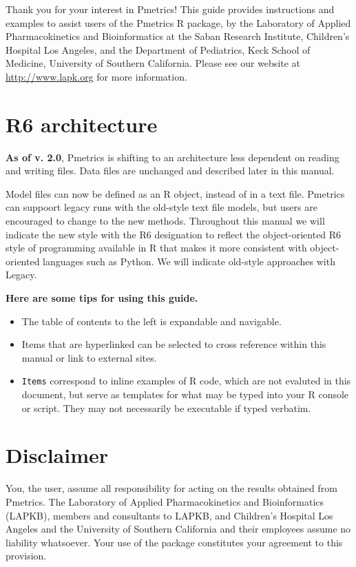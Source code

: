 \documentclass[
]{book}
\begin{document}
Thank you for your interest in Pmetrics! This guide provides
instructions and examples to assist users of the Pmetrics R package, by
the Laboratory of Applied Pharmacokinetics and Bioinformatics at the
Saban Research Institute, Children's Hospital Los Angeles, and the
Department of Pediatrics, Keck School of Medicine, University of
Southern California. Please see our website at
\href{http://www.lapk.org}{\underline{http://www.lapk.org}} for more
information.

\hypertarget{r6-architecture}{%
\section{R6 architecture}\label{r6-architecture}}

\textbf{As of v. 2.0}, Pmetrics is shifting to an architecture less dependent on
reading and writing files. Data files are unchanged and described later in
this manual.

Model files can now be defined as an R object, instead of in a text file.
Pmetrics can suppoort legacy runs with the old-style text file models, but
users are encouraged to change to the new methods. Throughout this manual we
will indicate the new style with the {R6} designation to reflect the
object-oriented R6 style of programming available in R that makes it more
consistent with object-oriented languages such as Python. We will indicate
old-style approaches with {Legacy}.

\textbf{Here are some tips for using this guide.}

\begin{itemize}
\item
  The table of contents to the left is expandable and navigable.
\item
  Items that are hyperlinked can be selected to cross reference
  within this manual or link to external sites.
\item
  \texttt{Items} correspond to inline examples of R code, which are not evaluted
  in this document, but serve as templates for what may be typed into your
  R console or script. They may not necessarily be executable if typed verbatim.
\end{itemize}

\hypertarget{disclaimer}{%
\section{Disclaimer}\label{disclaimer}}

You, the user, assume all responsibility for acting on the results
obtained from Pmetrics. The Laboratory of Applied Pharmacokinetics and
Bioinformatics (LAPKB), members and consultants to LAPKB, and Children's
Hospital Los Angeles and the University of Southern California and their
employees assume no liability whatsoever. Your use of the package
constitutes your agreement to this provision.
\end{document}

